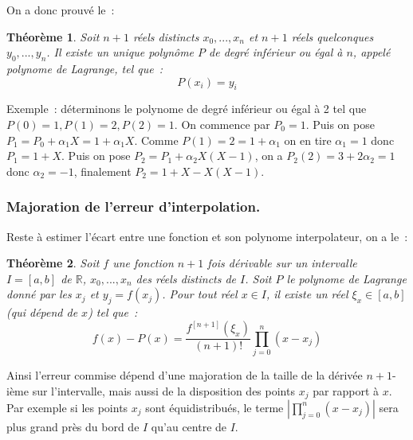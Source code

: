 \documentclass[a4paper,11pt]{article}
\newtheorem{thm}{Théorème}
\begin{document}
\begin{giacjshere}
On a donc prouv\'e le~:
\begin{thm}  
Soit $n+1$ r\'eels distincts $x_0,...,x_n$ et $n+1$
r\'eels quelconques $y_0,...,y_n$.
Il existe un unique polyn\^ome $P$ de degr\'e inf\'erieur ou \'egal \`a
$n$, appel\'e polynome de Lagrange, tel que~:
\[ P(x_i)=y_i\]
\end{thm}

Exemple~: d\'eterminons le polynome de degr\'e inf\'erieur ou \'egal
\`a 2 tel que $P(0)=1, P(1)=2, P(2)=1$. On commence par $P_0=1$.
Puis on pose $P_1=P_0+ \alpha_{1}X=1+ \alpha_{1}X$. 
Comme $P(1)=2=1+ \alpha_{1}$ on en tire $ \alpha_{1}=1$
donc $P_1=1+X$. Puis on pose $P_2=P_1+ \alpha_{2}X(X-1)$, on a 
$P_2(2)=3+2 \alpha_{2}=1$
donc $ \alpha_{2}=-1$, finalement $P_2=1+X-X(X-1)$.\\

\subsubsection{Majoration de l'erreur d'interpolation.}
Reste \`a estimer l'\'ecart entre une fonction et son polynome
interpolateur, on a le~:
\begin{thm} 
Soit $f$ une fonction $n+1$ fois d\'erivable sur un intervalle $I=[a,b]$
de $\mathbb{R}$, $x_0,...,x_n$ des r\'eels distincts de $I$. 
Soit $P$ le polynome de Lagrange donn\'e par les $x_j$ et $y_j=f(x_j)$.
Pour tout r\'eel $x \in I$,
il existe un r\'eel $\xi_x \in [a,b]$ (qui d\'epend de $x$) tel
que~:
\begin{equation} \label{eq:lagrange}
 f(x)-P(x) = \frac{f^{[n+1]}(\xi_x)}{(n+1)!} \prod_{j=0}^n(x-x_j) 
\end{equation}
\end{thm}
Ainsi l'erreur commise d\'epend d'une majoration de la taille
de la d\'eriv\'ee $n+1$-i\`eme sur l'intervalle, mais aussi
de la disposition des points $x_j$ par rapport \`a $x$. Par exemple
si les points $x_j$ sont \'equidistribu\'es, le terme
$|\prod_{j=0}^n(x-x_j)|$ sera plus grand pr\`es du bord de $I$ qu'au
centre de $I$.


\end{giacjshere}
\end{document}
